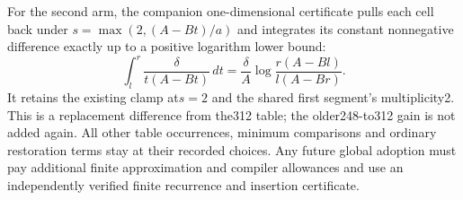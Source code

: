 For the second arm, the companion one-dimensional certificate pulls
each cell back under $s=\max(2,(A-Bt)/a)$ and integrates its constant
nonnegative difference exactly up to a positive logarithm lower bound:
\[
 \int_l^r\frac{\delta}{t(A-Bt)}\,dt
 =\frac{\delta}{A}\log\frac{r(A-Bl)}{l(A-Br)}.
\]
It retains the existing clamp at$s=2$ and the shared first segment's
multiplicity2. This is a replacement difference from the312 table;
the older248-to312 gain is not added again. All other table occurrences,
minimum comparisons and ordinary restoration terms stay at their
recorded choices. Any future global adoption must pay additional
finite approximation and compiler allowances and use an independently
verified finite recurrence and insertion certificate.
